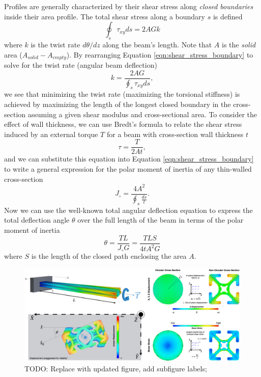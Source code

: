 Profiles are generally characterized by their shear stress along \textit{closed boundaries} inside their area profile. The total shear stress along a boundary $s$ is defined
%
\begin{equation}
    \oint_{s} \tau_{xy} ds = 2 A G k
    \label{eqn:shear_stress_boundary}
\end{equation}
%
where $k$ is the twist rate $d\theta / dz$ along the beam's length. Note that $A$ is the \textit{solid} area ($A_{solid} - A_{empty}$). By rearranging Equation \ref{eqn:shear_stress_boundary} to solve for the twist rate (angular beam deflection)
%
\begin{equation}
    k = \frac{2 A G}{\oint_{s} \tau_{xy} ds},
    \label{eqn:twist_rate}
\end{equation}
%
we see that minimizing the twist rate (maximizing the torsional stiffness) is achieved by maximizing the length of the longest closed boundary in the cross-section assuming a given shear modulus and cross-sectional area. To consider the effect of wall thickness, we can use Bredt's formula to relate the shear stress induced by an external torque $T$ for a beam with cross-section wall thickness $t$
%
\begin{equation}
    \tau = \frac{T}{2At},
    \label{eqn:bredts_formula}
\end{equation}
%
and we can substitute this equation into Equation \ref{eqn:shear_stress_boundary} to write a general expression for the polar moment of inertia of any thin-walled cross-section
%
\begin{equation}
    J_\circ = \frac{4A^2}{\oint_{s} \tfrac{ds}{t}}.
    \label{eqn:torsional_moment_general_equation}
\end{equation}
%
Now we can use the well-known total angular deflection equation to express the total deflection angle $\theta$ over the full length of the beam in terms of the polar moment of inertia
%
\begin{equation}
    \theta = \frac{TL}{J_\circ G} = \frac{TLS}{4tA^2G}
    \label{eqn:beam_twisting_equation}
\end{equation}
%
where $S$ is the length of the closed path enclosing the area $A$.

\begin{figure}
    \centering
    \includegraphics[width=\linewidth]{../figures/torsion_theory_cross-sections.png}
    \caption{TODO: Replace with updated figure, add subfigure labels;}
    \label{fig:torsion_theory_cross-sections}
\end{figure}

